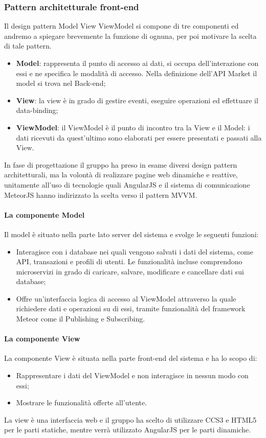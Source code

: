 \subsubsection{Pattern architetturale front-end}
Il design pattern Model View ViewModel si compone di tre componenti ed andremo a spiegare brevemente la funzione di ognuna, per poi motivare la scelta di tale pattern.
\begin{itemize}
	\item \textbf{Model}: rappresenta il punto di accesso ai dati, si occupa dell'interazione con essi e ne specifica le modalità di accesso. Nella definizione dell'API Market il model si trova nel Back-end;
	\item \textbf{View}: la view è in grado di gestire eventi, eseguire operazioni ed effettuare il data-binding;
	\item \textbf{ViewModel}: il ViewModel è  il punto di incontro tra la View e il Model: i dati ricevuti da quest’ultimo sono elaborati per essere presentati e passati alla View.
\end{itemize}

In fase di progettazione il gruppo ha preso in esame diversi design pattern architetturali, ma la volontà di realizzare pagine web dinamiche e reattive, unitamente all'uso di tecnologie quali AngularJS e il sistema di comunicazione MeteorJS hanno indirizzato la scelta verso il pattern MVVM.

\paragraph{La componente Model}
Il model è situato nella parte lato server del sistema e svolge le seguenti funzioni:
\begin{itemize}
	\item Interagisce con i database nei quali vengono salvati i dati del sistema, come API, transazioni e profili di utenti. Le funzionalità incluse comprendono microservizi in grado di caricare, salvare, modificare e cancellare dati sui database;
	\item Offre un'interfaccia logica di accesso al ViewModel attraverso la quale richiedere dati e operazioni su di essi, tramite funzionalità del framework Meteor come il Publishing e Subscribing.
\end{itemize}
\paragraph{La componente View}
La componente View è situata nella parte front-end del sistema e ha lo scopo di:
\begin{itemize}
	\item  Rappresentare i dati del ViewModel e non interagisce in nessun modo con essi;
	\item Mostrare le funzionalità offerte all'utente.
\end{itemize} 
La view è una interfaccia web e il gruppo ha scelto di utilizzare CCS3 e HTML5 per le parti statiche, mentre verrà utilizzato AngularJS per le parti dinamiche. 
